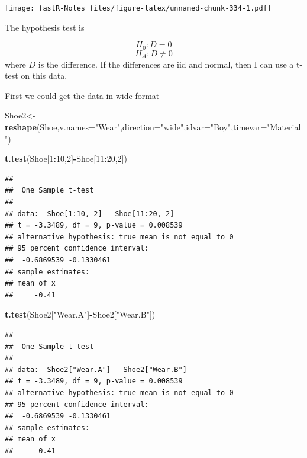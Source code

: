 \documentclass[]{book}
\newenvironment{Shaded}{\begin{snugshade}}{\end{snugshade}}
\newcommand{\KeywordTok}[1]{\textcolor[rgb]{0.13,0.29,0.53}{\textbf{#1}}}
\newcommand{\DataTypeTok}[1]{\textcolor[rgb]{0.13,0.29,0.53}{#1}}
\newcommand{\DecValTok}[1]{\textcolor[rgb]{0.00,0.00,0.81}{#1}}
\newcommand{\StringTok}[1]{\textcolor[rgb]{0.31,0.60,0.02}{#1}}
\newcommand{\OperatorTok}[1]{\textcolor[rgb]{0.81,0.36,0.00}{\textbf{#1}}}
\newcommand{\NormalTok}[1]{#1}
\theoremstyle{definition}
\theoremstyle{definition}
\theoremstyle{definition}
\theoremstyle{remark}
\begin{document}
\texttt{[image: fastR-Notes\_files/figure-latex/unnamed-chunk-334-1.pdf]}

The hypothesis test is

\[H_{0}: D = 0\] \[H_{A}: D \neq 0\] where \(D\) is the difference. If
the differences are iid and normal, then I can use a t-test on this
data.

First we could get the data in wide format

\begin{Shaded}
\begin{Highlighting}[]
\NormalTok{Shoe2<-}\KeywordTok{reshape}\NormalTok{(Shoe,}\DataTypeTok{v.names=}\StringTok{"Wear"}\NormalTok{,}\DataTypeTok{direction=}\StringTok{"wide"}\NormalTok{,}\DataTypeTok{idvar=}\StringTok{"Boy"}\NormalTok{,}\DataTypeTok{timevar=}\StringTok{"Material"}\NormalTok{)}
\end{Highlighting}
\end{Shaded}

\begin{Shaded}
\begin{Highlighting}[]
\KeywordTok{t.test}\NormalTok{(Shoe[}\DecValTok{1}\OperatorTok{:}\DecValTok{10}\NormalTok{,}\DecValTok{2}\NormalTok{]}\OperatorTok{-}\NormalTok{Shoe[}\DecValTok{11}\OperatorTok{:}\DecValTok{20}\NormalTok{,}\DecValTok{2}\NormalTok{])}
\end{Highlighting}
\end{Shaded}

\begin{verbatim}
## 
##  One Sample t-test
## 
## data:  Shoe[1:10, 2] - Shoe[11:20, 2]
## t = -3.3489, df = 9, p-value = 0.008539
## alternative hypothesis: true mean is not equal to 0
## 95 percent confidence interval:
##  -0.6869539 -0.1330461
## sample estimates:
## mean of x 
##     -0.41
\end{verbatim}

\begin{Shaded}
\begin{Highlighting}[]
\KeywordTok{t.test}\NormalTok{(Shoe2[}\StringTok{"Wear.A"}\NormalTok{]}\OperatorTok{-}\NormalTok{Shoe2[}\StringTok{"Wear.B"}\NormalTok{])}
\end{Highlighting}
\end{Shaded}

\begin{verbatim}
## 
##  One Sample t-test
## 
## data:  Shoe2["Wear.A"] - Shoe2["Wear.B"]
## t = -3.3489, df = 9, p-value = 0.008539
## alternative hypothesis: true mean is not equal to 0
## 95 percent confidence interval:
##  -0.6869539 -0.1330461
## sample estimates:
## mean of x 
##     -0.41
\end{verbatim}
\end{document}
